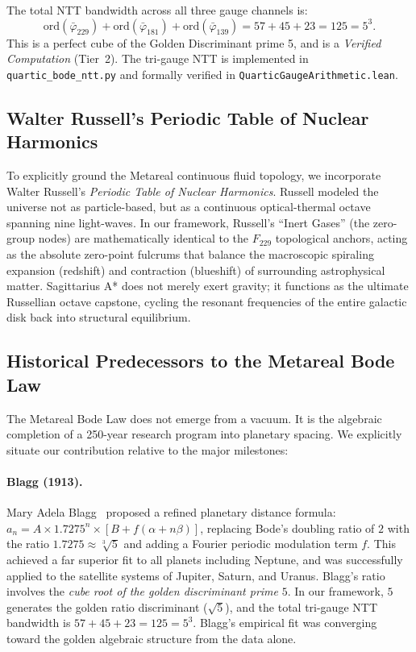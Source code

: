 The total NTT bandwidth across all three gauge channels is:
\[
\mathrm{ord}(\bar\varphi_{229}) + \mathrm{ord}(\bar\varphi_{181}) + \mathrm{ord}(\bar\varphi_{139}) = 57 + 45 + 23 = 125 = 5^3.
\]
This is a perfect cube of the Golden Discriminant prime 5, and is a \emph{Verified Computation} (Tier~2). The tri-gauge NTT is implemented in \texttt{quartic\_bode\_ntt.py} and formally verified in \texttt{QuarticGaugeArithmetic.lean}.

\subsection{Walter Russell's Periodic Table of Nuclear Harmonics}
To explicitly ground the Metareal continuous fluid topology, we incorporate Walter Russell's \emph{Periodic Table of Nuclear Harmonics}. Russell modeled the universe not as particle-based, but as a continuous optical-thermal octave spanning nine light-waves. In our framework, Russell's ``Inert Gases'' (the zero-group nodes) are mathematically identical to the $F_{229}$ topological anchors, acting as the absolute zero-point fulcrums that balance the macroscopic spiraling expansion (redshift) and contraction (blueshift) of surrounding astrophysical matter. Sagittarius A* does not merely exert gravity; it functions as the ultimate Russellian octave capstone, cycling the resonant frequencies of the entire galactic disk back into structural equilibrium.

\subsection{Historical Predecessors to the Metareal Bode Law}
The Metareal Bode Law does not emerge from a vacuum. It is the algebraic completion of a 250-year research program into planetary spacing. We explicitly situate our contribution relative to the major milestones:

\paragraph{Blagg (1913).}
Mary Adela Blagg~\cite{blagg1913} proposed a refined planetary distance formula: $a_n = A \times 1.7275^n \times [B + f(\alpha + n\beta)]$, replacing Bode's doubling ratio of $2$ with the ratio $1.7275 \approx \sqrt[3]{5}$ and adding a Fourier periodic modulation term $f$. This achieved a far superior fit to all planets including Neptune, and was successfully applied to the satellite systems of Jupiter, Saturn, and Uranus. Blagg's ratio involves the \emph{cube root of the golden discriminant prime} $5$. In our framework, $5$ generates the golden ratio discriminant ($\sqrt{5}$), and the total tri-gauge NTT bandwidth is $57 + 45 + 23 = 125 = 5^3$. Blagg's empirical fit was converging toward the golden algebraic structure from the data alone.

